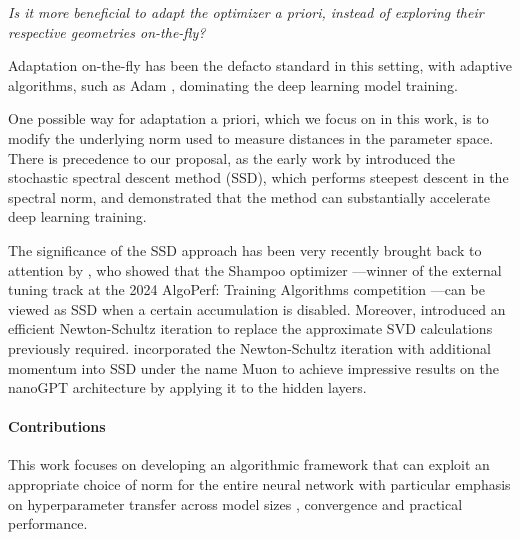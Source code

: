 \begin{center}
\emph{Is it more beneficial to adapt the optimizer a priori, instead of exploring their respective geometries on-the-fly?}
\end{center}
 
 
 
 














Adaptation on-the-fly has been the defacto standard in this setting, with adaptive algorithms, such as Adam \cite{kingma2014adam}, dominating the deep learning model training. 

One possible way for adaptation a priori, which we focus on in this work, is to modify the underlying norm used to measure distances in the parameter space. There is precedence to our proposal, as the 
early work by \citet{carlson2015stochastic,carlson2015stochasticb,carlson2015preconditioned} 
introduced the stochastic spectral descent method (SSD), which performs steepest descent in the spectral norm, and demonstrated that the method can substantially accelerate deep learning training. 


The significance of the SSD approach has been very recently brought back to attention by \citet{bernstein2024old}, who showed that the Shampoo optimizer \citep{gupta2017unified}—winner of the external tuning track at the 2024 AlgoPerf: Training Algorithms competition \citep{dahl2023benchmarking}—can be viewed as SSD when a certain accumulation is disabled. 
Moreover, \citet{bernstein2024old} introduced an efficient Newton-Schultz iteration to replace the approximate SVD calculations previously required. 
 incorporated the Newton-Schultz iteration with additional momentum into SSD under the name Muon to achieve impressive results on the nanoGPT architecture by applying it to the hidden layers.

\vspace{-3mm}
\paragraph{Contributions}
This work focuses on developing an algorithmic framework that can exploit an appropriate choice of norm for the entire neural network with particular emphasis on hyperparameter transfer across model sizes \citep{yang2021tensor}, convergence and practical performance.

